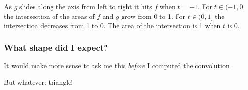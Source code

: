 As $g$ slides along the axis from left to right it hits $f$ when $t=-1$.
For $t \in (-1, 0]$ the intersection of the areas of $f$ and $g$ grow from 0 to 1.
For $t \in (0, 1]$ the intersection decreases from 1 to 0.
The area of the intersection is 1 when $t$ is 0.

\subsubsection{What shape did I expect?}
It would make more sense to ask me this \textit{before} I computed the convolution.

But whatever: triangle!
